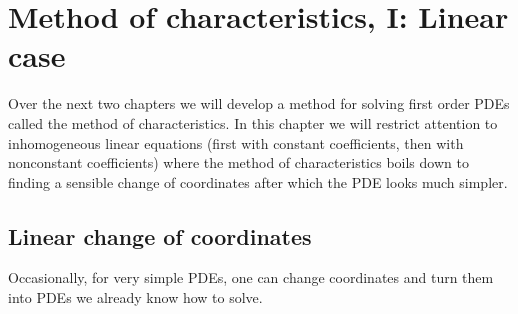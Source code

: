 


\chapter[Method of characteristics, I]{Method of characteristics, I: Linear case}

Over the next two chapters we will develop a method for solving first order PDEs called the method of characteristics. In this chapter we will restrict attention to inhomogeneous linear equations (first with constant coefficients, then with nonconstant coefficients) where the method of characteristics boils down to finding a sensible change of coordinates after which the PDE looks much simpler.

\section{Linear change of coordinates}\label{sct:linearcoord}

Occasionally, for very simple PDEs, one can change coordinates and turn them into PDEs we already know how to solve.

